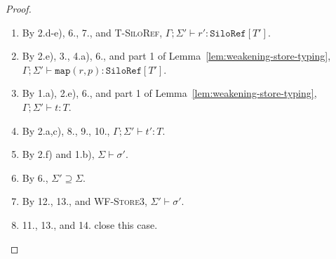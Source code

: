 \begin{proof}
\begin{itemize}
\begin{enumerate}
\item By 2.d-e), 6., 7., and \textsc{T-SiloRef}, $\Gamma ; \Sigma' \vdash r' : \texttt{SiloRef}[T']$.
\item By 2.e), 3., 4.a), 6., and part 1 of Lemma~\ref{lem:weakening-store-typing}, $\Gamma ; \Sigma' \vdash \texttt{map}(r, p) : \texttt{SiloRef}[T']$.
\item By 1.a), 2.e), 6., and part 1 of Lemma~\ref{lem:weakening-store-typing}, $\Gamma ; \Sigma' \vdash t : T$.
\item By 2.a,c), 8., 9., 10., $\Gamma ; \Sigma' \vdash t' : T$.
\item By 2.f) and 1.b), $\Sigma \vdash \sigma'$.
\item By 6., $\Sigma' \supseteq \Sigma$.
\item By 12., 13., and \textsc{WF-Store3}, $\Sigma' \vdash \sigma'$.
\item 11., 13., and 14. close this case.
\end{enumerate}


\end{itemize}
\end{proof}

